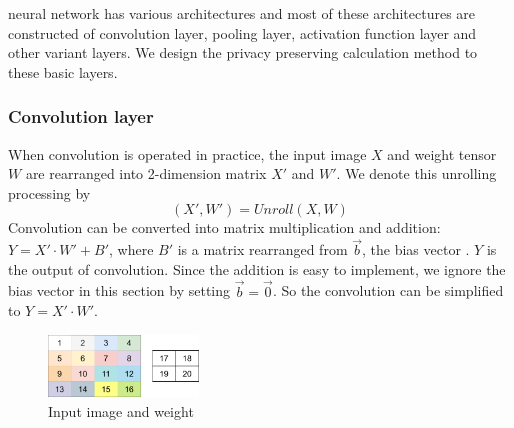\documentclass[letterpaper]{article} %
\begin{document}
    neural network has various architectures and
    most of these architectures are constructed of convolution layer,
    pooling layer, activation function layer and other variant layers.
    We design the privacy preserving calculation method to these basic layers.

    \subsubsection{Convolution layer}


    When convolution is operated in practice,
    the input image $X$ and weight tensor $W$
    are rearranged into 2-dimension matrix $X'$ and $W'$.
    We denote this unrolling processing by
    $$(X',W')=Unroll(X,W)$$
    Convolution can be converted into matrix multiplication and addition:
    $Y=X'\cdot W'+B'$, where $B'$ is a matrix rearranged from $\overrightarrow{b}$, the bias vector .
    $Y$ is the output of convolution.
    Since the addition is easy to implement, we ignore the bias vector in this section by setting $\overrightarrow{b}=\overrightarrow{0}$.
    So the convolution can be simplified to $Y=X'\cdot W'$.






    \begin{figure}[htbp]
        \centering
        \includegraphics[width=4cm]{new_unrolling.png}
        \caption{Input image and weight}
        \label{input image and weight}
    \end{figure}
\end{document}
